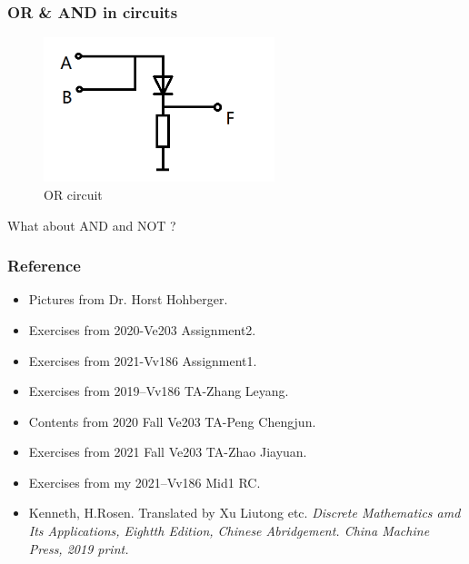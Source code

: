 \documentclass[xcolor=table]{beamer}
\newcommand{\myfont}{\rmfamily\normalsize\upshape\mdseries}
\begin{document}
\begin{frame}
    \frametitle{OR \& AND in circuits}
    \begin{figure}
        \centering
        \includegraphics[width=0.6\textwidth]{or_circuit_1.png}
        \caption{OR circuit}
    \end{figure}
    What about AND and NOT ?
\end{frame}
%                                           


\begin{frame}
    \frametitle{Reference}
    \begin{itemize}
        \item Pictures from Dr. Horst Hohberger.
        \item Exercises from 2020-Ve203 Assignment2.
        \item Exercises from 2021-Vv186 Assignment1.
        \item Exercises from 2019--Vv186 TA-Zhang Leyang.
        \item Contents from 2020 Fall Ve203 TA-Peng Chengjun.
        \item Exercises from 2021 Fall Ve203 TA-Zhao Jiayuan.
        \item Exercises from my 2021--Vv186 Mid1 RC.
        \item Kenneth, H.Rosen. Translated by Xu Liutong etc. \itshape Discrete Mathematics amd Its Applications\myfont, 
                 Eightth Edition, Chinese Abridgement. China Machine Press, 2019 print.
    \end{itemize}
\end{frame}
\end{document}

